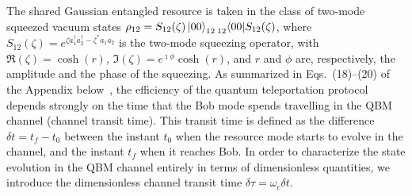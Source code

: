 \documentclass[prl,twocolumn,aps,floatfix,showpacs,tightenlines,superscriptaddress,amsmath,amssymb,amsfonts,10pt]{revtex4-1}
\begin{document}
The shared Gaussian entangled resource is taken in the class of two-mode squeezed vacuum states $\rho_{12}=S_{12}(\zeta)\ket{00}_{12}\prescript{}{12}{\bra{00}}S_{12}(\zeta)$, where $S_{12}(\zeta)=e^{\zeta a_1^\dag a_2^\dag-\zeta^* a_1 a_2}$ is the two-mode squeezing operator, with $\Re(\zeta)=\cosh(r)$, $\Im(\zeta)=e^{\imath\phi}\cosh(r)$, and $r$ and $\phi$ are, respectively, the amplitude and the phase of the squeezing. As summarized in Eqs.~(18)--(20) of the Appendix below~\cite{SuppMat}, the efficiency of the quantum teleportation protocol depends strongly on the time that the Bob mode spends travelling in the QBM channel (channel transit time). This transit time is defined as the difference $\delta t=t_f-t_0$ between the instant $t_0$  when the resource mode starts to evolve in the channel, and the instant $t_f$ when it reaches Bob. In order to characterize the state evolution in the QBM channel entirely in terms of dimensionless quantities, we introduce the dimensionless channel transit time $\delta\tau=\omega_c \delta t$.
\end{document}
